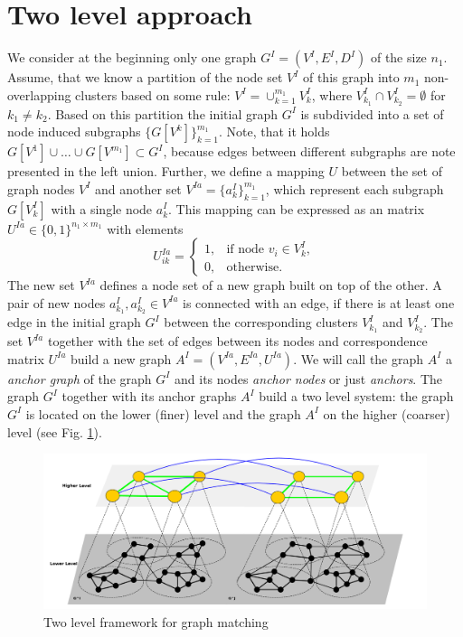 \section{Two level approach}
We consider at the beginning only one graph $G^I=(V^I,E^I,D^I)$ of the size $n_1$. Assume, that we know a partition of the node set $V^I$ of this graph into $m_1$ non-overlapping clusters based on some rule: $V^I=\cup_{k=1}^{m_1}V^I_k$, where $V^I_{k_1}\cap V^I_{k_2}=\emptyset$ for $k_1\not=k_2$. Based on this partition the initial graph $G^I$ is subdivided into a set of node induced subgraphs $\{G[V^k]\}_{k=1}^{m_1}$. Note, that it holds $G[V^1]\cup\dots\cup G[V^{m_1}]\subset G^I$, because edges between different subgraphs are note presented in the left union.
Further, we define a mapping $U$ between the set of graph nodes $V^I$ and another set $V^{Ia}=\{a^I_k\}_{k=1}^{m_1}$, which represent each subgraph  $G[V^I_k]$ with a single node $a^I_k$. This mapping can be expressed as an matrix $U^{Ia}\in\{0,1\}^{n_1\times m_1}$ with elements 
\begin{equation*}
U^{Ia}_{ik} = \begin{cases} 1, & \mbox{if node } v_i\in V^I_k,    \\
0, & \mbox{otherwise}.\end{cases}
\end{equation*}
The new set $V^{Ia}$ defines a node set of a new graph built on top of the other. A pair of new nodes $a^I_{k_1},a^I_{k_2}\in V^{Ia}$ is connected with an edge, if there is at least one edge in the initial graph $G^I$ between the corresponding clusters $V^I_{k_1}$ and $V^I_{k_2}$. The set $V^{Ia}$ together with the set of edges between its nodes and correspondence matrix $U^{Ia}$ build a new graph $A^I=(V^{Ia},E^{Ia},U^{Ia})$. We will call the graph $A^I$ a \emph{anchor graph} of the graph $G^I$ and its nodes \emph{anchor nodes} or just \emph{anchors}. The graph $G^I$ together with its anchor graphs $A^I$ build a two level system: the graph $G^I$ is located on the lower (finer) level and the graph $A^I$ on the higher (coarser) level (see Fig. \ref{fig:2levels}).

\begin{figure} [h!]
	\centering
	\includegraphics[scale=0.35]{chapter2/fig/twolevels2.pdf}
	\caption{Two level framework for graph matching} \label{fig:2levels}
\end{figure}

